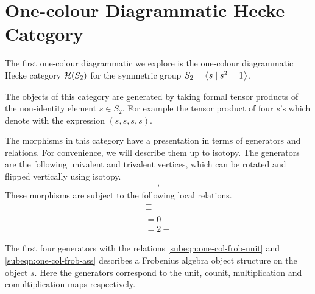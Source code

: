 \section{One-colour Diagrammatic Hecke Category}

The first one-colour diagrammatic we explore is the one-colour diagrammatic Hecke category $\mathcal{H}(S_2)$ for the symmetric group $S_2 = {\left\langle s \mathrel{|} s^2 = 1 \right\rangle}$. %

The objects of this category are generated by taking formal tensor products of the non-identity element $s \in S_2$. For example the tensor product of four $s$'s which denote with the expression $(s,s,s,s)$.

The morphisms in this category have a presentation in terms of generators and relations. For convenience, we will describe them up to isotopy. %
The generators are the following univalent and trivalent vertices, which can be rotated and flipped vertically using isotopy.
\begin{align}
    
    \quad , \quad
    
\end{align}
These morphisms are subject to the following local relations.
\begin{subequations} \label{eq:one-col-sbim-rel}
    \begin{gather}
        \label{subeqn:one-col-frob-unit}
         = 
        \\
        \label{subeqn:one-col-frob-ass}
         = 
        \\
         = 0
        \\
         = 2  - 
    \end{gather}
\end{subequations}

\begin{remark}
    The first four generators with the relations \eqref{subeqn:one-col-frob-unit} and \eqref{subeqn:one-col-frob-ass} describes a Frobenius algebra object structure on the object $s$. Here the generators correspond to the unit, counit, multiplication and comultiplication maps respectively.
\end{remark}

